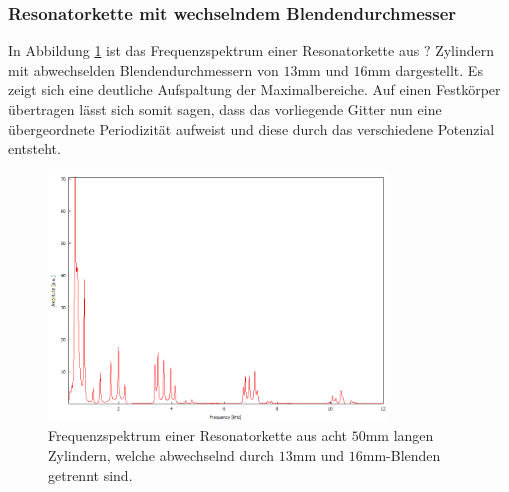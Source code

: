 \subsubsection*{Resonatorkette mit wechselndem Blendendurchmesser}
In Abbildung \ref{fig:abwech_blende} ist das Frequenzspektrum einer Resonatorkette aus $?$ Zylindern mit abwechselden Blendendurchmessern
von $13$mm und $16$mm dargestellt. Es zeigt sich eine deutliche Aufspaltung der Maximalbereiche.
Auf einen Festkörper übertragen lässt sich somit sagen, dass das vorliegende Gitter nun eine übergeordnete Periodizität aufweist und diese durch
das verschiedene Potenzial entsteht.

\begin{figure}
    \center
    \includegraphics[width=0.8\textwidth]{data/Festkoerper/periodisch/Spektrum_8_13mm_16mm_50.png}
    \caption{Frequenzspektrum einer Resonatorkette aus acht $50$mm langen Zylindern, welche abwechselnd durch $13$mm und $16$mm-Blenden getrennt sind.}
    \label{fig:abwech_blende}
\end{figure}
